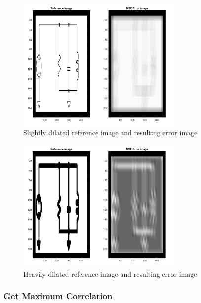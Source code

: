 \documentclass[10pt,twocolumn,letterpaper]{article}
\begin{document}
\begin{figure}[!ht]
\includegraphics[width = 3.2in]{img/detSW1.png}
\caption{Slightly dilated reference image and resulting error image}
\label{fig:detSW1}
\end{figure}
\par

\begin{figure}[!ht]
\includegraphics[width = 3.2in]{img/detSW2.png}
\caption{Heavily dilated reference image and resulting error image}
\label{fig:detSW2}
\end{figure}

\subsubsection*{Get Maximum Correlation}
\end{document}

